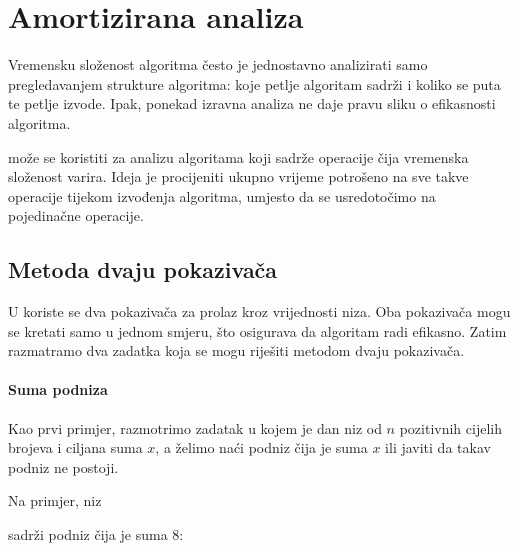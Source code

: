 \chapter{Amortizirana analiza}


Vremensku složenost algoritma
često je jednostavno analizirati
samo pregledavanjem strukture
algoritma:
koje petlje algoritam sadrži
i koliko se puta te petlje izvode.
Ipak, ponekad izravna analiza
ne daje pravu sliku o efikasnosti algoritma.

 može se koristiti za analizu
algoritama koji sadrže operacije čija
vremenska složenost varira.
Ideja je procijeniti ukupno vrijeme potrošeno na
sve takve operacije tijekom
izvođenja algoritma, umjesto da se usredotočimo
na pojedinačne operacije.

\section{Metoda dvaju pokazivača}


U 
koriste se dva pokazivača za
prolaz kroz vrijednosti niza.
Oba pokazivača mogu se kretati samo u jednom smjeru,
što osigurava da algoritam radi efikasno.
Zatim razmatramo dva zadatka koja se mogu riješiti
metodom dvaju pokazivača.

\subsubsection{Suma podniza}

Kao prvi primjer,
razmotrimo zadatak u kojem je
dan niz od $n$ pozitivnih cijelih brojeva
i ciljana suma $x$,
a želimo naći podniz čija je suma $x$
ili javiti da takav podniz ne postoji.

Na primjer, niz
\begin{center}
\end{center}
sadrži podniz čija je suma 8:
\begin{center}
\end{center}

